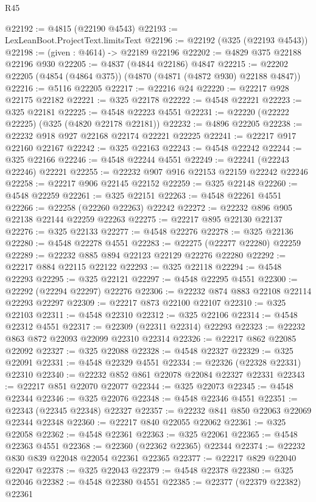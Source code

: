 \begin{lexlean}{R45}
\begin{coremodule}
@22192 := @4815 (@22190 @4543)
@22193 := LexLeanBoot.ProjectText.limitsText
@22196 := @22192 (@325 (@22193 @4543))
@22198 := (given : @4614) -> @22189 @22196
@22202 := @4829 @375 @22188 @22196 @930
@22205 := @4837 (@4844 @22186) @4847
@22215 := @22202 @22205 (@4854 (@4864 @375)) (@4870 (@4871 (@4872 @930) @22188 @4847))
@22216 := @5116 @22205
@22217 := @22216 @24
@22220 := @22217 @928 @22175 @22182
@22221 := @325 @22178
@22222 := @4548 @22221
@22223 := @325 @22181
@22225 := @4548 @22223 @4551
@22231 := @22220 (@22222 @22225) (@325 (@4820 @22178 @22181))
@22232 := @4896 @22205
@22238 := @22232 @918 @927 @22168 @22174 @22221 @22225
@22241 := @22217 @917 @22160 @22167
@22242 := @325 @22163
@22243 := @4548 @22242
@22244 := @325 @22166
@22246 := @4548 @22244 @4551
@22249 := @22241 (@22243 @22246) @22221
@22255 := @22232 @907 @916 @22153 @22159 @22242 @22246
@22258 := @22217 @906 @22145 @22152
@22259 := @325 @22148
@22260 := @4548 @22259
@22261 := @325 @22151
@22263 := @4548 @22261 @4551
@22266 := @22258 (@22260 @22263) @22242
@22272 := @22232 @896 @905 @22138 @22144 @22259 @22263
@22275 := @22217 @895 @22130 @22137
@22276 := @325 @22133
@22277 := @4548 @22276
@22278 := @325 @22136
@22280 := @4548 @22278 @4551
@22283 := @22275 (@22277 @22280) @22259
@22289 := @22232 @885 @894 @22123 @22129 @22276 @22280
@22292 := @22217 @884 @22115 @22122
@22293 := @325 @22118
@22294 := @4548 @22293
@22295 := @325 @22121
@22297 := @4548 @22295 @4551
@22300 := @22292 (@22294 @22297) @22276
@22306 := @22232 @874 @883 @22108 @22114 @22293 @22297
@22309 := @22217 @873 @22100 @22107
@22310 := @325 @22103
@22311 := @4548 @22310
@22312 := @325 @22106
@22314 := @4548 @22312 @4551
@22317 := @22309 (@22311 @22314) @22293
@22323 := @22232 @863 @872 @22093 @22099 @22310 @22314
@22326 := @22217 @862 @22085 @22092
@22327 := @325 @22088
@22328 := @4548 @22327
@22329 := @325 @22091
@22331 := @4548 @22329 @4551
@22334 := @22326 (@22328 @22331) @22310
@22340 := @22232 @852 @861 @22078 @22084 @22327 @22331
@22343 := @22217 @851 @22070 @22077
@22344 := @325 @22073
@22345 := @4548 @22344
@22346 := @325 @22076
@22348 := @4548 @22346 @4551
@22351 := @22343 (@22345 @22348) @22327
@22357 := @22232 @841 @850 @22063 @22069 @22344 @22348
@22360 := @22217 @840 @22055 @22062
@22361 := @325 @22058
@22362 := @4548 @22361
@22363 := @325 @22061
@22365 := @4548 @22363 @4551
@22368 := @22360 (@22362 @22365) @22344
@22374 := @22232 @830 @839 @22048 @22054 @22361 @22365
@22377 := @22217 @829 @22040 @22047
@22378 := @325 @22043
@22379 := @4548 @22378
@22380 := @325 @22046
@22382 := @4548 @22380 @4551
@22385 := @22377 (@22379 @22382) @22361

\end{coremodule}
\end{lexlean}
